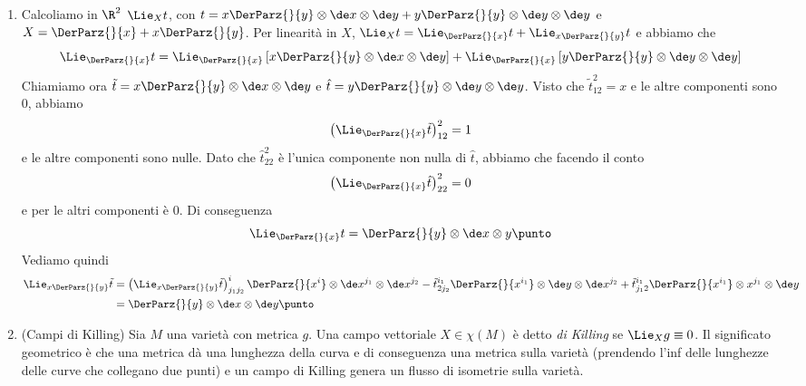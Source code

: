 \begin{example}
	\begin{enumerate}
		\item Calcoliamo in $\R^2$ $\Lie_Xt$, con $t=x\DerParz{}{y}\otimes \de x \otimes \de y + y\DerParz{}{y} \otimes \de y \otimes \de y$ e $X = \DerParz{}{x} + x \DerParz{}{y}$.
		Per linearità in $X$, $\Lie_Xt = \Lie_{\DerParz{}{x}}t + \Lie_{x\DerParz{}{y}}t$ e abbiamo che
		\begin{equation*}
			\Lie_{\DerParz{}{x}} t = \Lie_{\DerParz{}{x}} \left[x \DerParz{}{y}\otimes \de x \otimes \de y\right] + \Lie_{\DerParz{}{x}} \left[y \DerParz{}{y}\otimes \de y \otimes \de y\right]
		\end{equation*}
		Chiamiamo ora $\tilde t = x\DerParz{}{y}\otimes \de x \otimes \de y$ e $\hat t = y\DerParz{}{y} \otimes \de y \otimes \de y$. Visto che $\tilde t_{12}^2 = x$ e le altre componenti sono 0, abbiamo
		\begin{equation*}
			\left(\Lie_{\DerParz{}{x}}\tilde t\right)_{12}^2 = 1
		\end{equation*}
		e le altre componenti sono nulle. 
		Dato che $\hat t_{22}^2$ è l'unica componente non nulla di $\hat t$, abbiamo che facendo il conto
		\begin{equation*}
			\left(\Lie_{\DerParz{}{x}}\hat t\right)_{22}^2 = 0
		\end{equation*}
		e per le altri componenti è 0. Di conseguenza
		\begin{equation*}
			\Lie_{\DerParz{}{x}} t = \DerParz{}{y} \otimes \de x \otimes y \punto
		\end{equation*}
		Vediamo quindi
		\begin{align*}
			\Lie_{x\DerParz{}{y}} \tilde t &= \left(\Lie_{x\DerParz{}{y}} \tilde t\right)_{j_1j_2}^i \DerParz{}{x^i}\otimes\de x^{j_1}\otimes \de x^{j_2} - \tilde t_{2j_2}^{i_1}\DerParz{}{x^{i_1}} \otimes \de y\otimes \de x^{j_2}
			+ \tilde t_{j_12}^{i_1} \DerParz{}{x^{i_1}} \otimes x^{j_1}\otimes \de y\\
			&= \DerParz{}{y}\otimes \de x \otimes \de y \punto
		\end{align*}

		
		\item (Campi di Killing) Sia $M$ una varietà con metrica $g$. Una campo vettoriale $X\in\chi(M)$ è detto \emph{di Killing} se $\Lie_Xg \equiv 0$. Il significato geometrico è che una metrica dà una lunghezza della curva e di conseguenza una metrica sulla varietà (prendendo l'inf delle lunghezze delle curve che collegano due punti) e un campo di Killing genera un flusso di isometrie sulla varietà.
		

\end{enumerate}
\end{example}

